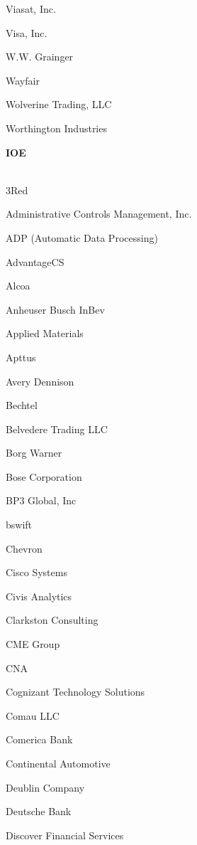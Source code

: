 \documentclass[twoside]{article}
\begin{document}
\begin{center}
\begin{multicols}{5}
\begin{FlushLeft}
\begin{compactitem}
\item Viasat, Inc.
\item Visa, Inc.
\item W.W. Grainger
\item Wayfair
\item Wolverine Trading, LLC
\item Worthington Industries
\end{compactitem}
        \end{FlushLeft}
        \vspace{1em}
        {\fontsize{14}{16}\selectfont \bf IOE}\\
        \vspace{-1em}
        ~\hrulefill~
        \vspace{-.9em}
        \begin{FlushLeft}
        \begin{compactitem}
        \item 3Red
\item Administrative Controls Management, Inc.
\item ADP (Automatic Data Processing)
\item AdvantageCS
\item Alcoa
\item Anheuser Busch InBev
\item Applied Materials
\item Apttus
\item Avery Dennison
\item Bechtel
\item Belvedere Trading LLC
\item Borg Warner
\item Bose Corporation
\item BP3 Global, Inc
\item bswift
\item Chevron
\item Cisco Systems
\item Civis Analytics
\item Clarkston Consulting
\item CME Group
\item CNA
\item Cognizant Technology Solutions
\item Comau LLC
\item Comerica Bank
\item Continental Automotive
\item Deublin Company
\item Deutsche Bank
\item Discover Financial Services

\end{compactitem}
\end{FlushLeft}
\end{multicols}
\end{center}
\end{document}
